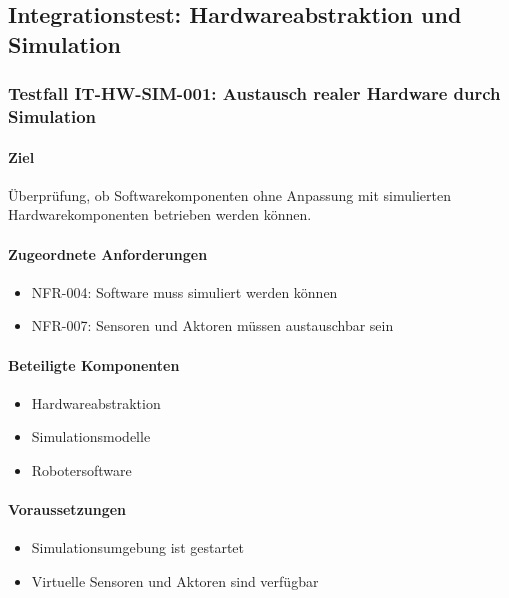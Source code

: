 \subsection{Integrationstest: Hardwareabstraktion und
Simulation}\label{integrationstest-hardwareabstraktion-und-simulation}

\subsubsection{Testfall IT-HW-SIM-001: Austausch realer Hardware durch
Simulation}\label{testfall-it-hw-sim-001-austausch-realer-hardware-durch-simulation}

\paragraph{Ziel}\label{ziel-15}

Überprüfung, ob Softwarekomponenten ohne Anpassung mit simulierten
Hardwarekomponenten betrieben werden können.

\paragraph{Zugeordnete
Anforderungen}\label{zugeordnete-anforderungen-15}

\begin{itemize}
\tightlist
\item
  NFR-004: Software muss simuliert werden können
\item
  NFR-007: Sensoren und Aktoren müssen austauschbar sein
\end{itemize}

\paragraph{Beteiligte Komponenten}\label{beteiligte-komponenten-6}

\begin{itemize}
\tightlist
\item
  Hardwareabstraktion
\item
  Simulationsmodelle
\item
  Robotersoftware
\end{itemize}

\paragraph{Voraussetzungen}\label{voraussetzungen-15}

\begin{itemize}
\tightlist
\item
  Simulationsumgebung ist gestartet
\item
  Virtuelle Sensoren und Aktoren sind verfügbar
\end{itemize}

